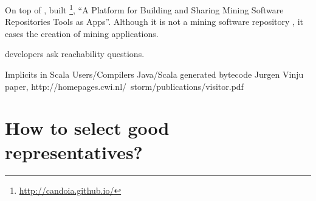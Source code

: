 On top of \boa{}, \cite{tiwari_candoia:_2017} built \candoia{}\footnote{\url{http://candoia.github.io/}}, ``A Platform for Building and Sharing Mining Software Repositories Tools as Apps''.
Although it is not a mining software repository \perse{}, it eases the creation of mining applications.

\cite{latoza_developers_2010} developers ask reachability questions.




Implicits in Scala
Users/Compilers Java/Scala generated bytecode
Jurgen Vinju paper,
http://homepages.cwi.nl/~storm/publications/visitor.pdf


\section{How to select good representatives?}
